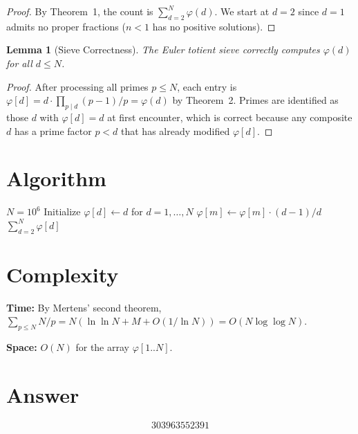 \documentclass[12pt,a4paper]{article}
\newtheorem{lemma}[theorem]{Lemma}
\begin{document}
\begin{proof}
By Theorem~1, the count is $\sum_{d=2}^{N} \varphi(d)$. We start at $d = 2$ since $d = 1$ admits no proper fractions ($n < 1$ has no positive solutions).
\end{proof}

\begin{lemma}[Sieve Correctness]
The Euler totient sieve correctly computes $\varphi(d)$ for all $d \leq N$.
\end{lemma}

\begin{proof}
After processing all primes $p \leq N$, each entry is $\varphi[d] = d \cdot \prod_{p \mid d} (p-1)/p = \varphi(d)$ by Theorem~2. Primes are identified as those $d$ with $\varphi[d] = d$ at first encounter, which is correct because any composite $d$ has a prime factor $p < d$ that has already modified $\varphi[d]$.
\end{proof}

\section{Algorithm}

\begin{algorithm}[H]
\caption{Count reduced proper fractions with denominator $\leq N$}
\begin{algorithmic}[1]
\Require $N = 10^6$
\State Initialize $\varphi[d] \gets d$ for $d = 1, \ldots, N$
     
            \State $\varphi[m] \gets \varphi[m] \cdot (d-1) / d$
        \EndFor
    \EndIf
\EndFor
\State \Return $\sum_{d=2}^{N} \varphi[d]$
\end{algorithmic}
\end{algorithm}

\section{Complexity}

\textbf{Time:} By Mertens' second theorem, $\sum_{p \leq N} N/p = N(\ln\ln N + M + O(1/\ln N)) = O(N \log \log N)$.

\textbf{Space:} $O(N)$ for the array $\varphi[1..N]$.

\section{Answer}

\[
\boxed{303963552391}
\]
\end{document}
